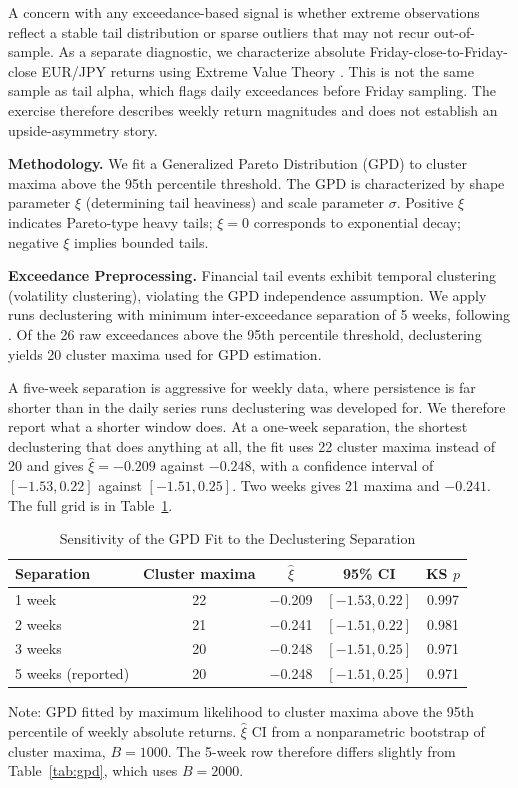 \documentclass[11pt]{article}
\begin{document}
A concern with any exceedance-based signal is whether extreme observations reflect a stable tail distribution or sparse outliers that may not recur out-of-sample. As a separate diagnostic, we characterize absolute Friday-close-to-Friday-close EUR/JPY returns using Extreme Value Theory \citep{mcneil2000estimation, coles2001introduction}. This is not the same sample as tail alpha, which flags daily exceedances before Friday sampling. The exercise therefore describes weekly return magnitudes and does not establish an upside-asymmetry story.

\textbf{Methodology.} We fit a Generalized Pareto Distribution (GPD) to cluster maxima above the 95th percentile threshold. The GPD is characterized by shape parameter $\xi$ (determining tail heaviness) and scale parameter $\sigma$. Positive $\xi$ indicates Pareto-type heavy tails; $\xi = 0$ corresponds to exponential decay; negative $\xi$ implies bounded tails.

\textbf{Exceedance Preprocessing.} Financial tail events exhibit temporal clustering (volatility clustering), violating the GPD independence assumption. We apply runs declustering with minimum inter-exceedance separation of 5 weeks, following \citet{coles2001introduction}. Of the 26 raw exceedances above the 95th percentile threshold, declustering yields 20 cluster maxima used for GPD estimation.

A five-week separation is aggressive for weekly data, where persistence is far shorter than in the daily series runs declustering was developed for. We therefore report what a shorter window does. At a one-week separation, the shortest declustering that does anything at all, the fit uses 22 cluster maxima instead of 20 and gives $\hat{\xi} = -0.209$ against $-0.248$, with a confidence interval of $[-1.53, 0.22]$ against $[-1.51, 0.25]$. Two weeks gives 21 maxima and $-0.241$. The full grid is in Table~\ref{tab:decluster}.

\begin{table}[H]
\centering
\caption{Sensitivity of the GPD Fit to the Declustering Separation}
\label{tab:decluster}
\small
\begin{tabular}{@{}lcccc@{}}
\toprule
Separation & Cluster maxima & $\hat{\xi}$ & 95\% CI & KS $p$ \\
\midrule
1 week & 22 & $-$0.209 & $[-1.53, 0.22]$ & 0.997 \\
2 weeks & 21 & $-$0.241 & $[-1.51, 0.22]$ & 0.981 \\
3 weeks & 20 & $-$0.248 & $[-1.51, 0.25]$ & 0.971 \\
5 weeks (reported) & 20 & $-$0.248 & $[-1.51, 0.25]$ & 0.971 \\
\bottomrule
\end{tabular}
\par\vspace{0.3em}
\parbox{\linewidth}{\footnotesize Note: GPD fitted by maximum likelihood to cluster maxima above the 95th percentile of weekly absolute returns. $\hat{\xi}$ CI from a nonparametric bootstrap of cluster maxima, $B = 1000$. The 5-week row therefore differs slightly from Table~\ref{tab:gpd}, which uses $B = 2000$.}
\end{table}
\end{document}
